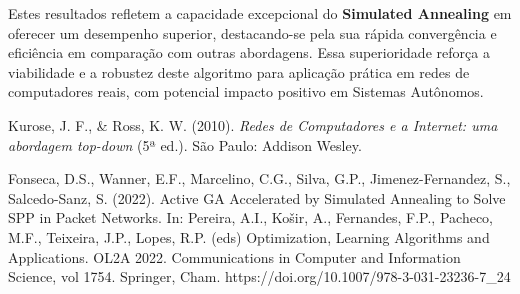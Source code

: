 \documentclass[conference]{IEEEtran}
\begin{document}
Estes resultados refletem a capacidade excepcional do \textbf{Simulated Annealing} em oferecer um desempenho superior, destacando-se pela sua rápida convergência e eficiência em comparação com outras abordagens. Essa superioridade reforça a viabilidade e a robustez deste algoritmo para aplicação prática em redes de computadores reais, com potencial impacto positivo em Sistemas Autônomos.

\begin{thebibliography}{00}
Kurose, J. F., \& Ross, K. W. (2010). \textit{Redes de Computadores e a Internet: uma abordagem top-down} (5ª ed.). São Paulo: Addison Wesley.

Fonseca, D.S., Wanner, E.F., Marcelino, C.G., Silva, G.P., Jimenez-Fernandez, S., Salcedo-Sanz, S. (2022). Active GA Accelerated by Simulated Annealing to Solve SPP in Packet Networks. In: Pereira, A.I., Košir, A., Fernandes, F.P., Pacheco, M.F., Teixeira, J.P., Lopes, R.P. (eds) Optimization, Learning Algorithms and Applications. OL2A 2022. Communications in Computer and Information Science, vol 1754. Springer, Cham. https://doi.org/10.1007/978-3-031-23236-7\_24
\end{thebibliography} 
\end{document}
